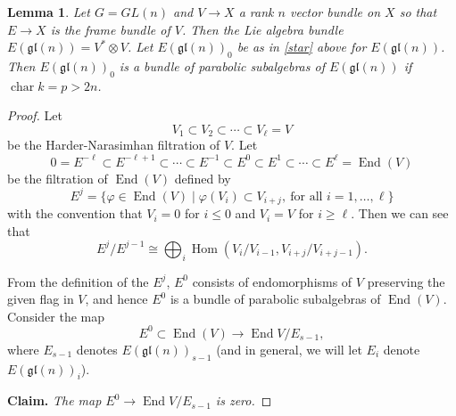 \documentclass[12pt]{article}
\newtheorem{lemma}[proposition]{Lemma}
\begin{document}
\begin{lemma}\label{lem:2.1}
Let $G = GL(n)$ and $V \to X$ a rank $n$ vector bundle on $X$ so that $E \to X$ is the frame bundle of $V$. Then the Lie algebra bundle $E(\mathfrak{gl}(n)) = V^* \otimes V$. Let $E(\mathfrak{gl}(n))_0$ be as in \eqref{star} above for $E(\mathfrak{gl}(n))$. Then $E(\mathfrak{gl}(n))_0$ is a bundle of parabolic subalgebras of $E(\mathfrak{gl}(n))$ if $\operatorname{char} k = p > 2n$.
\end{lemma}
\begin{proof}
Let
\[
V_1 \subset V_2 \subset \cdots \subset V_\ell = V
\]
be the Harder-Narasimhan filtration of $V$. Let
\[
0 = E^{-\ell} \subset E^{-\ell+1} \subset \cdots \subset E^{-1} \subset E^0 \subset E^1 \subset \cdots \subset E^\ell = \operatorname{End}(V)
\]
be the filtration of $\operatorname{End}(V)$ defined by
\[
E^j = \{ \varphi \in \operatorname{End}(V) \mid \varphi(V_i) \subset V_{i+j}, \ \text{for all } i = 1, \ldots, \ell \}
\]
with the convention that $V_i = 0$ for $i \leq 0$ and $V_i = V$ for $i \geq \ell$. Then we can see that
\[
E^j / E^{j-1} \cong \bigoplus_i \operatorname{Hom}(V_i / V_{i-1}, V_{i+j} / V_{i+j-1}).
\]

From the definition of the $E^j$, $E^0$ consists of endomorphisms of $V$ preserving the given flag in $V$, and hence $E^0$ is a bundle of parabolic subalgebras of $\operatorname{End}(V)$. Consider the map
\[
E^0 \subset \operatorname{End}(V) \to \operatorname{End} V/E_{s-1},
\]
where $E_{s-1}$ denotes $E(\mathfrak{gl}(n))_{s-1}$ (and in general, we will let $E_i$ denote $E(\mathfrak{gl}(n))_i$).


\medskip
\noindent\textbf{Claim.}\emph{ The map $E^0 \to \operatorname{End} V/E_{s-1}$ is zero.}


\end{proof}
\end{document}
